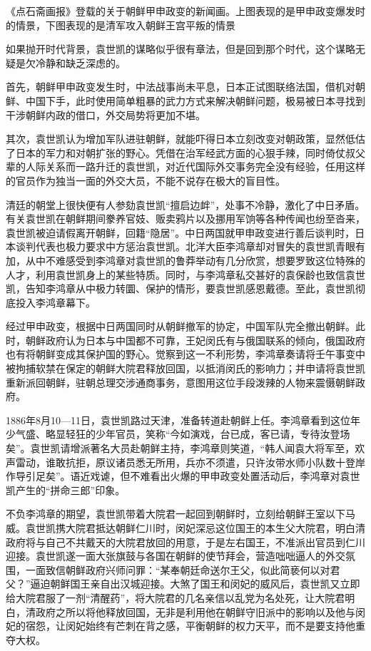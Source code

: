 \documentclass[12pt,UTF8]{ctexbook}
\begin{document}
《点石斋画报》登载的关于朝鲜甲申政变的新闻画。上图表现的是甲申政变爆发时的情景，下图表现的是清军攻入朝鲜王宫平叛的情景

如果抛开时代背景，袁世凯的谋略似乎很有章法，但是回到那个时代，这个谋略无疑是欠冷静和缺乏深虑的。

首先，朝鲜甲申政变发生时，中法战事尚未平息，日本正试图联络法国，借机对朝鲜、中国下手，此时使用简单粗暴的武力方式来解决朝鲜问题，极易被日本寻找到干涉朝鲜内政的借口，外交局势将更加不堪。

其次，袁世凯认为增加军队进驻朝鲜，就能吓得日本立刻改变对朝政策，显然低估了日本的军力和对朝扩张的野心。凭借在治军经武方面的心狠手辣，同时倚仗叔父辈的人际关系而一路升迁的袁世凯，对近代国际外交事务完全没有经验，任用这样的官员作为独当一面的外交大员，不能不说存在极大的盲目性。

清廷的朝堂上很快便有人参劾袁世凯“擅启边衅”，处事不冷静，激化了中日矛盾。有关袁世凯在朝鲜期间豢养官妓、贩卖鸦片以及挪用军饷等各种传闻也纷至沓来，袁世凯被迫请假离开朝鲜，回籍“隐居”。中日两国就甲申政变进行善后谈判时，日本谈判代表也极力要求中方惩治袁世凯。北洋大臣李鸿章却对冒失的袁世凯青眼有加，从中不难感受到李鸿章对袁世凯的鲁莽举动有几分欣赏，想要罗致这位特殊的人才，利用袁世凯身上的某些特质。同时，与李鸿章私交甚好的袁保龄也致信袁世凯，告知李鸿章从中极力转圜、保护的情形，要袁世凯感恩戴德。至此，袁世凯彻底投入李鸿章幕下。

经过甲申政变，根据中日两国同时从朝鲜撤军的协定，中国军队完全撤出朝鲜。此时，朝鲜政府认为日本与中国都不可靠，王妃闵氏有与俄国联系的倾向，俄国政府也有将朝鲜变成其保护国的野心。觉察到这一不利形势，李鸿章奏请将壬午事变中被拘捕软禁在保定的朝鲜大院君释放回国，以抵消闵氏的影响力；并申请将袁世凯重新派回朝鲜，驻朝总理交涉通商事务，意图用这位手段泼辣的人物来震慑朝鲜政府。

1886年8月10—11日，袁世凯路过天津，准备转道赴朝鲜上任。李鸿章看到这位年少气盛、略显轻狂的少年官员，笑称“今如演戏，台已成，客已请，专待汝登场矣”。袁世凯请增派著名大员赴朝鲜主持，李鸿章则笑道，“韩人闻袁大将军至，欢声雷动，谁敢抗拒，原议诸员悉无所用，兵亦不须遣，只许汝带水师小队数十登岸作导引足矣”。语近戏谑，但不难看出火爆的甲申政变处置活动后，李鸿章对袁世凯产生的“拼命三郎”印象。

不负李鸿章的期望，袁世凯带着大院君一起回到朝鲜时，立刻给朝鲜王室以下马威。袁世凯携大院君抵达朝鲜仁川时，闵妃深忌这位国王的本生父大院君，明白清政府将与自己不共戴天的大院君放回的用意，于是左右国王，不准派出官员到仁川迎接。袁世凯遂一面大张旗鼓与各国在朝鲜的使节拜会，营造咄咄逼人的外交氛围，一面致信朝鲜政府兴师问罪：“某奉朝廷命送尔王父，似此简亵何以对君父？”逼迫朝鲜国王亲自出汉城迎接。大煞了国王和闵妃的威风后，袁世凯又立即给大院君服了一剂“清醒药”，将大院君的几名亲信以乱党为名处死，让大院君明白，清政府之所以将他释放回国，无非是利用他在朝鲜守旧派中的影响以及他与闵妃的宿怨，让闵妃始终有芒刺在背之感，平衡朝鲜的权力天平，而不是要支持他重夺大权。
\end{document}

